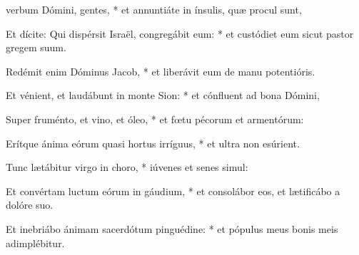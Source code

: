 \begin{psalmus}

 verbum Dómini, gentes, * et annuntiáte in ínsulis, quæ procul sunt,

Et dícite: Qui dispérsit Israël, congregábit eum: * et custódiet eum sicut pastor gregem suum.

Redémit enim Dóminus Jacob, * et liberávit eum de manu potentióris.

Et vénient, et laudábunt in monte Sion: * et cónfluent ad bona Dómini,

Super fruménto, et vino, et óleo, * et fœtu pécorum et armentórum:

Erítque ánima eórum quasi hortus irríguus, * et ultra non esúrient.

Tunc lætábitur virgo in choro, * iúvenes et senes simul:

Et convértam luctum eórum in gáudium, * et consolábor eos, et lætificábo a dolóre suo.

Et inebriábo ánimam sacerdótum pinguédine: * et pópulus meus bonis meis adimplébitur.
\end{psalmus}
